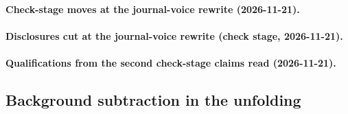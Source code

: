\paragraph{Check-stage moves at the journal-voice rewrite (2026-11-21).}

\paragraph{Disclosures cut at the journal-voice rewrite (check stage, 2026-11-21).}

\paragraph{Qualifications from the second check-stage claims read (2026-11-21).}

\subsection{Background subtraction in the unfolding}\label{recsec:method-background}

